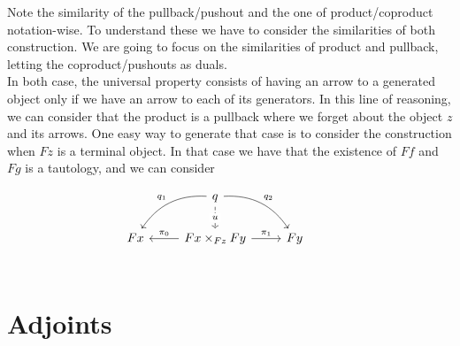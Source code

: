 Note the  similarity of the pullback/pushout and the one of product/coproduct notation-wise. To understand these we have to consider the similarities of both construction. We are going to focus on the similarities of product and pullback, letting the coproduct/pushouts as duals.\\

In both case, the universal property consists of having an arrow to a generated object only if we have an arrow to each of its generators. In this line of reasoning, we can consider that the product is a pullback where we forget about the object $z$ and its arrows. One easy way to generate that case is to consider the construction when $Fz$ is a terminal object. In that case we have that the existence of $Ff$ and $Fg$ is a tautology, and we can consider 

\[
\begin{tikzcd}
& q
\arrow[bend left]{dr}{q_2}
\arrow[bend right,swap]{dl}{q_1}
\arrow[dashed]{d}[description]{u} & & \\
 Fx  & Fx\times_{Fz}Fy \arrow{r}{\pi_1} \arrow{l}[swap]{\pi_0}& Fy \\
\end{tikzcd}
\]








\section{Adjoints}


